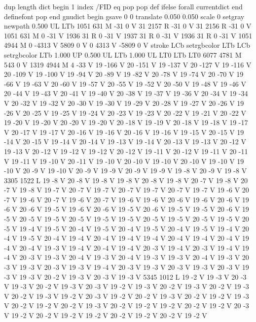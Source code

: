 {{{{{dup length dict begin {1 index /FID eq {pop pop} {def} ifelse} forall
currentdict end definefont pop
end
gnudict begin
gsave
0 0 translate
0.050 0.050 scale
0 setgray
newpath
0.500 UL
LTb
1051 631 M
-31 0 V
31 2157 R
-31 0 V
31 2156 R
-31 0 V
1051 631 M
0 -31 V
1936 31 R
0 -31 V
1937 31 R
0 -31 V
1936 31 R
0 -31 V
1051 4944 M
0 -4313 V
5809 0 V
0 4313 V
-5809 0 V
stroke
LCb setrgbcolor
LTb
LCb setrgbcolor
LTb
1.000 UP
0.500 UL
LTb
1.000 UL
LT0
LTb
LT0
6077 4781 M
543 0 V
1319 4944 M
4 -33 V
19 -166 V
20 -151 V
19 -137 V
20 -127 V
19 -116 V
20 -109 V
19 -100 V
19 -94 V
20 -89 V
19 -82 V
20 -78 V
19 -74 V
20 -70 V
19 -66 V
19 -63 V
20 -60 V
19 -57 V
20 -55 V
19 -52 V
20 -50 V
19 -48 V
19 -46 V
20 -44 V
19 -43 V
20 -41 V
19 -40 V
20 -38 V
19 -37 V
19 -36 V
20 -34 V
19 -34 V
20 -32 V
19 -32 V
20 -30 V
19 -30 V
19 -29 V
20 -28 V
19 -27 V
20 -26 V
19 -26 V
20 -25 V
19 -25 V
19 -24 V
20 -23 V
19 -23 V
20 -22 V
19 -21 V
20 -22 V
19 -20 V
19 -20 V
20 -20 V
19 -20 V
20 -18 V
19 -19 V
20 -18 V
19 -18 V
19 -17 V
20 -17 V
19 -17 V
20 -16 V
19 -16 V
20 -16 V
19 -16 V
19 -15 V
20 -15 V
19 -14 V
20 -15 V
19 -14 V
20 -14 V
19 -13 V
19 -14 V
20 -13 V
19 -13 V
20 -12 V
19 -13 V
20 -12 V
19 -12 V
19 -12 V
20 -12 V
19 -11 V
20 -12 V
19 -11 V
20 -11 V
19 -11 V
19 -10 V
20 -11 V
19 -10 V
20 -10 V
19 -10 V
20 -10 V
19 -10 V
19 -10 V
20 -9 V
19 -10 V
20 -9 V
19 -9 V
20 -9 V
19 -9 V
19 -8 V
20 -9 V
19 -8 V
3305 1522 L
19 -8 V
20 -8 V
19 -8 V
19 -8 V
20 -8 V
19 -8 V
20 -7 V
19 -8 V
20 -7 V
19 -8 V
19 -7 V
20 -7 V
19 -7 V
20 -7 V
19 -7 V
20 -7 V
19 -7 V
19 -6 V
20 -7 V
19 -6 V
20 -7 V
19 -6 V
20 -7 V
19 -6 V
19 -6 V
20 -6 V
19 -6 V
20 -6 V
19 -6 V
20 -6 V
19 -5 V
19 -6 V
20 -6 V
19 -5 V
20 -6 V
19 -5 V
19 -5 V
20 -6 V
19 -5 V
20 -5 V
19 -5 V
20 -5 V
19 -5 V
19 -5 V
20 -5 V
19 -5 V
20 -5 V
19 -5 V
20 -5 V
19 -4 V
19 -5 V
20 -4 V
19 -5 V
20 -4 V
19 -5 V
20 -4 V
19 -5 V
19 -4 V
20 -4 V
19 -5 V
20 -4 V
19 -4 V
20 -4 V
19 -4 V
19 -4 V
20 -4 V
19 -4 V
20 -4 V
19 -4 V
20 -4 V
19 -3 V
19 -4 V
20 -4 V
19 -4 V
20 -3 V
19 -4 V
20 -3 V
19 -4 V
19 -4 V
20 -3 V
19 -3 V
20 -4 V
19 -3 V
20 -4 V
19 -3 V
19 -3 V
20 -4 V
19 -3 V
20 -3 V
19 -3 V
20 -3 V
19 -3 V
19 -4 V
20 -3 V
19 -3 V
20 -3 V
19 -3 V
20 -3 V
19 -3 V
19 -3 V
20 -2 V
19 -3 V
20 -3 V
19 -3 V
5345 1012 L
19 -2 V
19 -3 V
20 -3 V
19 -3 V
20 -2 V
19 -3 V
20 -3 V
19 -2 V
19 -3 V
20 -2 V
19 -3 V
20 -2 V
19 -3 V
20 -2 V
19 -3 V
19 -2 V
20 -3 V
19 -2 V
20 -2 V
19 -3 V
20 -2 V
19 -2 V
19 -3 V
20 -2 V
19 -2 V
20 -2 V
19 -3 V
20 -2 V
19 -2 V
19 -2 V
20 -2 V
19 -2 V
20 -3 V
19 -2 V
20 -2 V
19 -2 V
19 -2 V
20 -2 V
19 -2 V
20 -2 V
19 -2 V
}}}}}
